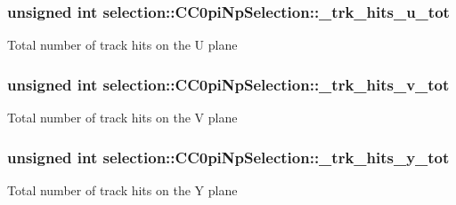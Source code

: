 \subsubsection[{\texorpdfstring{\+\_\+trk\+\_\+hits\+\_\+u\+\_\+tot}{_trk_hits_u_tot}}]{\setlength{\rightskip}{0pt plus 5cm}unsigned int selection\+::\+C\+C0pi\+Np\+Selection\+::\+\_\+trk\+\_\+hits\+\_\+u\+\_\+tot\hspace{0.3cm}{\ttfamily [private]}}\hypertarget{classselection_1_1CC0piNpSelection_af7d0e867df8901ff3e531b4c1b96408a}{}\label{classselection_1_1CC0piNpSelection_af7d0e867df8901ff3e531b4c1b96408a}
Total number of track hits on the U plane 
\subsubsection[{\texorpdfstring{\+\_\+trk\+\_\+hits\+\_\+v\+\_\+tot}{_trk_hits_v_tot}}]{\setlength{\rightskip}{0pt plus 5cm}unsigned int selection\+::\+C\+C0pi\+Np\+Selection\+::\+\_\+trk\+\_\+hits\+\_\+v\+\_\+tot\hspace{0.3cm}{\ttfamily [private]}}\hypertarget{classselection_1_1CC0piNpSelection_a30fe5ccb6a299f7955125aa6c9d5923d}{}\label{classselection_1_1CC0piNpSelection_a30fe5ccb6a299f7955125aa6c9d5923d}
Total number of track hits on the V plane 
\subsubsection[{\texorpdfstring{\+\_\+trk\+\_\+hits\+\_\+y\+\_\+tot}{_trk_hits_y_tot}}]{\setlength{\rightskip}{0pt plus 5cm}unsigned int selection\+::\+C\+C0pi\+Np\+Selection\+::\+\_\+trk\+\_\+hits\+\_\+y\+\_\+tot\hspace{0.3cm}{\ttfamily [private]}}\hypertarget{classselection_1_1CC0piNpSelection_a76eb07fcb9190709464880c0ea7c4eba}{}\label{classselection_1_1CC0piNpSelection_a76eb07fcb9190709464880c0ea7c4eba}
Total number of track hits on the Y plane 
